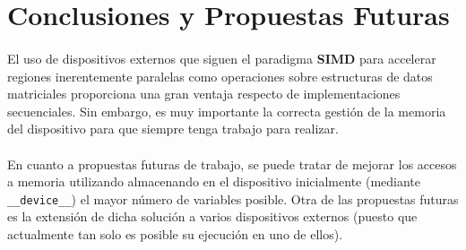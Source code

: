 \documentclass[10pt, a4paper,spanish]{article}
\begin{document}
	\section{Conclusiones y Propuestas Futuras}

		\paragraph{}
		El uso de dispositivos externos que siguen el paradigma \textbf{SIMD} para accelerar regiones inerentemente paralelas como operaciones sobre estructuras de datos matriciales proporciona una gran ventaja respecto de implementaciones secuenciales. Sin embargo, es muy importante la correcta gestión de la memoria del dispositivo para que siempre tenga trabajo para realizar.

		\paragraph{}
		En cuanto a propuestas futuras de trabajo, se puede tratar de mejorar los accesos a memoria utilizando almacenando en el dispositivo inicialmente (mediante \texttt{\_\_device\_\_}) el mayor número de variables posible. Otra de las propuestas futuras es la extensión de dicha solución a varios dispositivos externos (puesto que actualmente tan solo es posible su ejecución en uno de ellos).

	\nocite{subject:cp}
  
  
\end{document}
